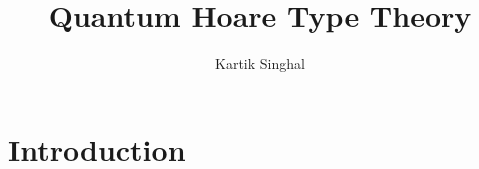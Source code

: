 \documentclass[adraft,creativecommons]{eptcs}
\title{Quantum Hoare Type Theory}
\author{
Kartik Singhal
\institute{University of Chicago}
\email{\mailtodomain{ks@cs.uchicago.edu}}
}
\begin{document}
\maketitle

\section{Introduction}


\end{document}
